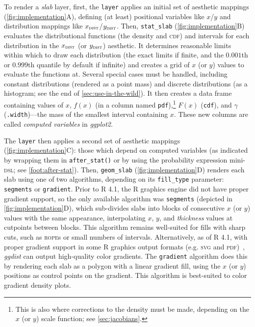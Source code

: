 \documentclass[journal]{vgtc}                     %
\begin{document}
To render a \textit{slab} layer, first, the \texttt{layer} applies an initial set of aesthetic mappings (\cref{fig:implementation}A), defining (at least) positional variables like $x$/$y$ and distribution mappings like $x_\textsc{dist}$/$y_\textsc{dist}$. Then, \texttt{stat\_slab} (\cref{fig:implementation}B) evaluates the distributional functions (the density and \textsc{cdf}) and intervals for each distribution in the $x_\textsc{dist}$ (or $y_\textsc{dist}$) aesthetic. It determines reasonable limits within which to draw each distribution (the exact limits if finite, and the $0.001$th or $0.999$th quantile by default if infinite) and creates a grid of $x$ (or $y$) values to evaluate the functions at. Several special cases must be handled, including constant distributions (rendered as a point mass) and discrete distributions (as a histogram; see the end of \cref{sec:use-in-the-wild}). It then creates a data frame containing values of $x$,  $f(x)$ (in a column named \texttt{pdf}),\footnote{This is also where corrections to the density must be made, depending on the $x$ (or $y$) scale function; see \cref{sec:jacobians}.} $F(x)$ (\texttt{cdf}), and $\gamma$ (\texttt{.width})---the mass of the smallest interval containing $x$. These new columns are called \textit{computed variables} in \textit{ggplot2}.

The \texttt{layer} then applies a second set of aesthetic mappings (\cref{fig:implementation}C): those which depend on computed variables (as indicated by wrapping them in \texttt{after\_stat()} or by using the probability expression mini-\textsc{dsl}; see \cref{foot:after-stat}). Then, \texttt{geom\_slab} (\cref{fig:implementation}D) renders each slab using one of two algorithms, depending on its \texttt{fill\_type} parameter: \texttt{segments} or \texttt{gradient}. Prior to R 4.1, the R graphics engine did not have proper gradient support, so the only available algorithm was \texttt{segments} (depicted in \cref{fig:implementation}D), which sub-divides slabs into blocks of consecutive $x$ (or $y$) values with the same appearance, interpolating $x$, $y$, and \textit{thickness} values at cutpoints between blocks. This algorithm remains well-suited for fills with sharp cuts, such as \textsc{rope}s or small numbers of intervals. Alternatively, as of R 4.1, with proper gradient support in some R graphics output formats (e.g. \textsc{svg} and \textsc{pdf})~\cite{murrell2022vectorised}, \textit{ggdist} can output high-quality color gradients. The \texttt{gradient} algorithm does this by rendering each slab as a polygon with a linear gradient fill, using the $x$ (or $y$) positions as control points on the gradient. This algorithm is best-suited to color gradient density plots.
\end{document}
